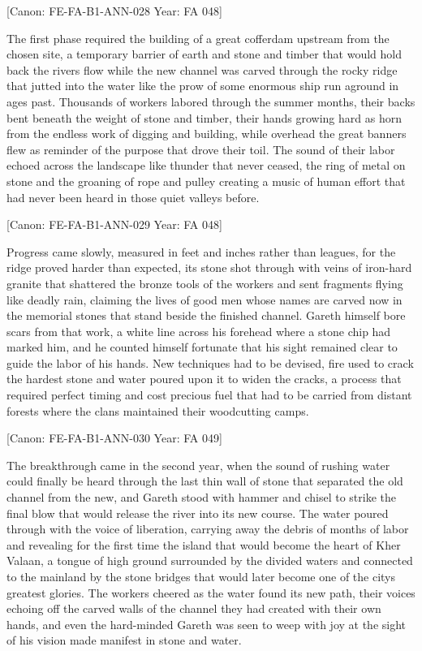 {[}Canon: FE-FA-B1-ANN-028 \textbar{} Year: FA 048{]}

The first phase required the building of a great cofferdam upstream from
the chosen site, a temporary barrier of earth and stone and timber that
would hold back the river\textquotesingle s flow while the new channel
was carved through the rocky ridge that jutted into the water like the
prow of some enormous ship run aground in ages past. Thousands of
workers labored through the summer months, their backs bent beneath the
weight of stone and timber, their hands growing hard as horn from the
endless work of digging and building, while overhead the great banners
flew as reminder of the purpose that drove their toil. The sound of
their labor echoed across the landscape like thunder that never ceased,
the ring of metal on stone and the groaning of rope and pulley creating
a music of human effort that had never been heard in those quiet valleys
before.

{[}Canon: FE-FA-B1-ANN-029 \textbar{} Year: FA 048{]}

Progress came slowly, measured in feet and inches rather than leagues,
for the ridge proved harder than expected, its stone shot through with
veins of iron-hard granite that shattered the bronze tools of the
workers and sent fragments flying like deadly rain, claiming the lives
of good men whose names are carved now in the memorial stones that stand
beside the finished channel. Gareth himself bore scars from that work, a
white line across his forehead where a stone chip had marked him, and he
counted himself fortunate that his sight remained clear to guide the
labor of his hands. New techniques had to be devised, fire used to crack
the hardest stone and water poured upon it to widen the cracks, a
process that required perfect timing and cost precious fuel that had to
be carried from distant forests where the clans maintained their
woodcutting camps.

{[}Canon: FE-FA-B1-ANN-030 \textbar{} Year: FA 049{]}

The breakthrough came in the second year, when the sound of rushing
water could finally be heard through the last thin wall of stone that
separated the old channel from the new, and Gareth stood with hammer and
chisel to strike the final blow that would release the river into its
new course. The water poured through with the voice of liberation,
carrying away the debris of months of labor and revealing for the first
time the island that would become the heart of Kher Valaan, a tongue of
high ground surrounded by the divided waters and connected to the
mainland by the stone bridges that would later become one of the
city\textquotesingle s greatest glories. The workers cheered as the
water found its new path, their voices echoing off the carved walls of
the channel they had created with their own hands, and even the
hard-minded Gareth was seen to weep with joy at the sight of his vision
made manifest in stone and water.

